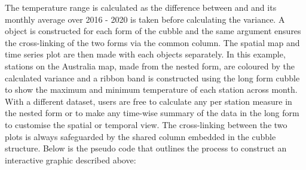 \documentclass[
]{jss}
\newenvironment{Shaded}{\begin{snugshade}}{\end{snugshade}}
\newcommand{\AttributeTok}[1]{\textcolor[rgb]{0.77,0.63,0.00}{#1}}
\newcommand{\CommentTok}[1]{\textcolor[rgb]{0.56,0.35,0.01}{\textit{#1}}}
\newcommand{\FunctionTok}[1]{\textcolor[rgb]{0.00,0.00,0.00}{#1}}
\newcommand{\NormalTok}[1]{#1}
\newcommand{\OtherTok}[1]{\textcolor[rgb]{0.56,0.35,0.01}{#1}}
\newcommand{\SpecialCharTok}[1]{\textcolor[rgb]{0.00,0.00,0.00}{#1}}
\newcommand{\StringTok}[1]{\textcolor[rgb]{0.31,0.60,0.02}{#1}}
\begin{document}
The temperature range is calculated as the difference between
 and  and its monthly average over 2016 - 2020 is
taken before calculating the variance. A  object is
constructed for each form of the cubble and the same 
argument ensures the cross-linking of the two forms via the common
 column. The spatial map and time series plot are then made
with each  objects separately. In this example,
stations on the Australia map, made from the nested form, are coloured
by the calculated variance and a ribbon band is constructed using the
long form cubble to show the maximum and minimum temperature of each
station across month. With a different dataset, users are free to
calculate any per station measure in the nested form or to make any
time-wise summary of the data in the long form to customise the spatial
or temporal view. The cross-linking between the two plots is always
safeguarded by the shared  column embedded in the cubble
structure. Below is the pseudo code that outlines the process to
construct an interactive graphic described above:

\begin{Shaded}
\end{Shaded}
\end{document}
